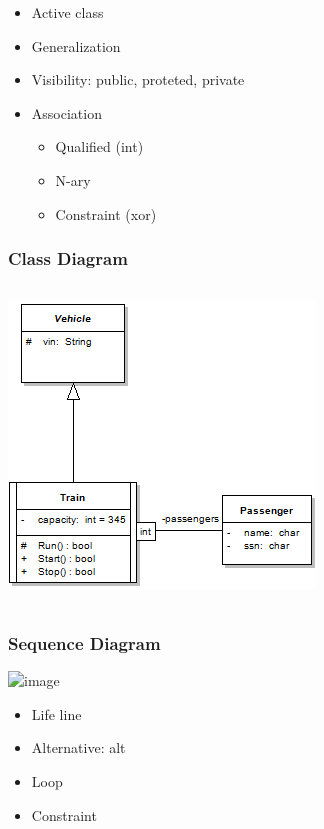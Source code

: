 \note
{
\begin{itemize}
	\item Active class
	\item Generalization
	\item Visibility: public, proteted, private
	\item Association
	\begin{itemize}
		\item Qualified (int)
		\item N-ary
		\item Constraint (xor)
	\end{itemize}
\end{itemize}

}

%
%
\frame
{
  \frametitle{Class Diagram}
  
\begin{columns}
\begin{column}[l]{5cm}

	\begin{center}
	\includegraphics[width=\textwidth]{images/TrainExample.png}
	\end{center}

\end{column}
\begin{column}[r]{5cm}
	
	\begin{center}
	\end{center}

\end{column}
\end{columns}
  

}


%
%
\frame
{
  \frametitle{Sequence Diagram}

\begin{center}
	\includegraphics<1->[width=0.5\textwidth]{images/SequenceDiagram.png}%
\end{center}
}


\note
{
\begin{itemize}
	\item Life line
	\item Alternative: alt
	\item Loop
	\item Constraint
\end{itemize}

}
